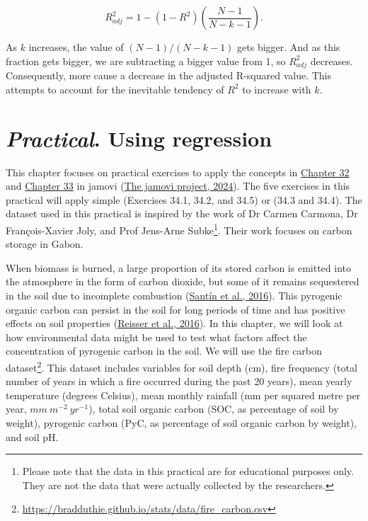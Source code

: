 \documentclass[
  openany]{krantz}
\begin{document}
\[R^{2}_{adj} = 1 - \left(1 - R^{2}\right)\left(\frac{N - 1}{N - k - 1}\right).\]

As \(k\) increases, the value of \((N-1)/(N-k-1)\) gets bigger.
And as this fraction gets bigger, we are subtracting a bigger value from 1, so \(R^{2}_{adj}\) decreases.
Consequently, more  cause a decrease in the adjusted R-squared value.
This attempts to account for the inevitable tendency of \(R^{2}\) to increase with \(k\).

\hypertarget{Chapter_34}{%
\chapter{\texorpdfstring{\emph{Practical}. Using regression}{Practical. Using regression}}\label{Chapter_34}}

This chapter focuses on practical exercises to apply the concepts in \protect\hyperlink{Chapter_32}{Chapter 32} and \protect\hyperlink{Chapter_33}{Chapter 33} in jamovi (\protect\hyperlink{ref-Jamovi2022}{The jamovi project, 2024}).
The five exercises in this practical will apply simple  (Exercises 34.1, 34.2, and 34.5) or  (34.3 and 34.4).
The dataset used in this practical is inspired by the work of Dr Carmen Carmona, Dr François-Xavier Joly, and Prof Jens-Arne Subke\footnote{Please note that the data in this practical are for educational purposes only. They are not the data that were actually collected by the researchers.}.
Their work focuses on carbon storage in Gabon.

When biomass is burned, a large proportion of its stored carbon is emitted into the atmosphere in the form of carbon dioxide, but some of it remains sequestered in the soil due to incomplete combustion (\protect\hyperlink{ref-Santin2016}{Santín et al., 2016}).
This pyrogenic organic carbon can persist in the soil for long periods of time and has positive effects on soil properties (\protect\hyperlink{ref-Reisser2016}{Reisser et al., 2016}).
In this chapter, we will look at how environmental data might be used to test what factors affect the concentration of pyrogenic carbon in the soil.
We will use the fire carbon dataset\footnote{\url{https://bradduthie.github.io/stats/data/fire_carbon.csv}}.
This dataset includes variables for soil depth (cm), fire frequency (total number of years in which a fire occurred during the past 20 years), mean yearly temperature (degrees Celsius), mean monthly rainfall (mm per squared metre per year, \(mm\:m^{-2}\:yr^{-1}\)), total soil organic carbon (SOC, as percentage of soil by weight), pyrogenic carbon (PyC, as percentage of soil organic carbon by weight), and soil pH.
\end{document}
